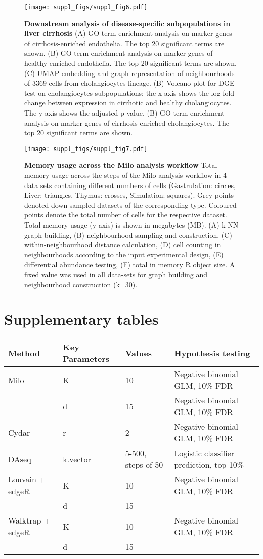 \documentclass[
]{article}
\begin{document}
\begin{figure}
\centering
\texttt{[image: suppl\_figs/suppl\_fig6.pdf]}
\caption{\label{fig:sup-fig-6}\textbf{Downstream analysis of disease-specific subpopulations in liver cirrhosis}
(A) GO term enrichment analysis on marker genes of cirrhosis-enriched endothelia. The top 20 significant terms are shown.
(B) GO term enrichment analysis on marker genes of healthy-enriched endothelia. The top 20 significant terms are shown.
(C) UMAP embedding and graph representation of neighbourhoods of 3369 cells from cholangiocytes lineage.
(B) Volcano plot for DGE test on cholangiocytes subpopulations: the x-axis shows the log-fold change between expression in cirrhotic and healthy cholangiocytes. The y-axis shows the adjusted p-value.
(B) GO term enrichment analysis on marker genes of cirrhosis-enriched cholangiocytes. The top 20 significant terms are shown.}
\end{figure}








\begin{figure}
\centering
\texttt{[image: suppl\_figs/suppl\_fig7.pdf]}
\caption{\label{fig:sup-fig-7}\textbf{Memory usage across the Milo analysis workflow}
Total memory usage across the steps of the Milo analysis workflow in 4 data sets containing different numbers of cells (Gastrulation: circles, Liver: triangles, Thymus: crosses, Simulation: squares). Grey points denoted down-sampled datasets of the corresponding type. Coloured points denote the total number of cells for the respective dataset. Total memory usage (y-axis) is shown in megabytes (MB). (A) k-NN graph building, (B) neighbourhood sampling and construction, (C) within-neighbourhood distance calculation, (D) cell counting in neighbourhoods according to the input experimental design, (E) differential abundance testing, (F) total in memory R object size. A fixed value was used in all data-sets for graph building and neighbourhood construction (k=30).}
\end{figure}




\newpage

\hypertarget{supplementary-tables}{%
\section{Supplementary tables}\label{supplementary-tables}}

\begin{longtable}[]{@{}llll@{}}
\toprule
Method & Key Parameters & Values & Hypothesis testing\tabularnewline
\midrule
\endhead
Milo & K & 10 & Negative binomial GLM, 10\% FDR\tabularnewline
& d & 15 & Negative binomial GLM, 10\% FDR\tabularnewline
Cydar & r & 2 & Negative binomial GLM, 10\% FDR\tabularnewline
DAseq & k.vector & 5-500, steps of 50 & Logistic classifier prediction, top 10\%\tabularnewline
Louvain + edgeR & K & 10 & Negative binomial GLM, 10\% FDR\tabularnewline
& d & 15 &\tabularnewline
Walktrap + edgeR & K & 10 & Negative binomial GLM, 10\% FDR\tabularnewline
& d & 15 &\tabularnewline
\bottomrule
\end{longtable}
\end{document}
